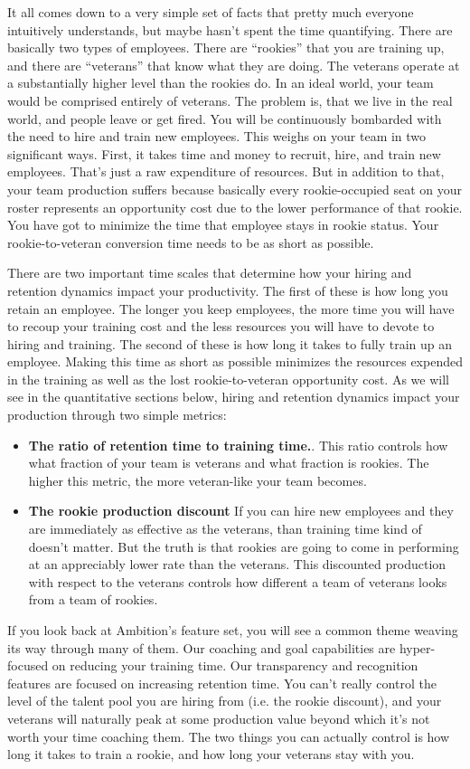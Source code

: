 \documentclass[paper=a4, fontsize=11pt abstract]{scrartcl}
\numberwithin{equation}{section}		%
\numberwithin{figure}{section}			%
\numberwithin{table}{section}				%
\begin{document}
It all comes down to a very simple set of facts that pretty much everyone intuitively understands, but maybe hasn't spent the time quantifying.  There are basically two types of employees.  There are ``rookies'' that you are training up, and there are ``veterans'' that know what they are doing.  The veterans operate at a substantially higher level than the rookies do.  In an ideal world, your team would be comprised entirely of veterans.  The problem is, that we live in the real world, and people leave or get fired.  You will be continuously bombarded with the need to hire and train new employees.  This weighs on your team in two significant ways.  First, it takes time and money to recruit, hire, and train new employees.  That's just a raw expenditure of resources.  But in addition to that, your team production suffers because basically every rookie-occupied seat on your roster represents an opportunity cost due to the lower performance of that rookie.  You have got to minimize the time that employee stays in rookie status.  Your rookie-to-veteran conversion time needs to be as short as possible.

There are two important time scales that determine how your hiring and retention dynamics impact your productivity.  The first of these is how long you retain an employee.  The longer you keep employees, the more time you will have to recoup your training cost and the less resources you will have to devote to hiring and training.  The second of these is how long it takes to fully train up an employee.  Making this time as short as possible minimizes the resources expended in the training as well as the lost rookie-to-veteran opportunity cost.  As we will see in the quantitative sections below, hiring and retention dynamics impact your production through two simple metrics:
\begin{itemize}
    \item \textbf{The ratio of retention time to training time.}. This ratio controls how what fraction of your team is veterans and what fraction is rookies.  The higher this metric, the more veteran-like your team becomes.
    \item \textbf{The rookie production discount} If you can hire new employees and they are immediately as effective as the veterans, than training time kind of doesn't matter.  But the truth is that rookies are going to come in performing at an appreciably lower rate than the veterans.  This discounted production with respect to the veterans controls how different a team of veterans looks from a team of rookies.
\end{itemize}
If you look back at Ambition's feature set, you will see a common theme weaving its way through many of them.  Our coaching and goal capabilities are hyper-focused on reducing your training time. Our transparency and recognition features are focused on increasing retention time.  You can't really control the level of the talent pool you are hiring from (i.e. the rookie discount), and your veterans will naturally peak at some production value beyond which it's not worth your time coaching them.  The two things you can actually control is how long it takes to train a rookie, and how long your veterans stay with you.
\end{document}
